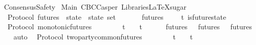 %
\begin{isabellebody}%
%
%
\isadelimdocument
%
\endisadelimdocument
%
\isatagdocument
%
\isamarkuptrue%
%
\endisatagdocument
{\isafolddocument}%
%
\isadelimdocument
%
\endisadelimdocument
%
\isadelimtheory
%
\endisadelimtheory
%
\isatagtheory
{}\isamarkupfalse%
\ ConsensusSafety\isanewline
\isanewline
{}\ Main\ CBCCasper\ {\isachardoublequoteopen}Libraries{\isacharslash}LaTeXsugar{\isachardoublequoteclose}\isanewline
\isanewline
{}%
\endisatagtheory
{\isafoldtheory}%
%
\isadelimtheory
\isanewline
%
\endisadelimtheory
\isanewline
\isanewline
\isanewline
\isanewline
\isanewline
{}\isamarkupfalse%
\ {\isacharparenleft}\ Protocol{\isacharparenright}\ futures\ {\isacharcolon}{\isacharcolon}\ {\isachardoublequoteopen}state\ {\isasymRightarrow}\ state\ set{\isachardoublequoteclose}\isanewline
\ \ \isanewline
\ \ \ \ {\isachardoublequoteopen}futures\ {\isasymsigma}\ {\isacharequal}\ {\isacharbraceleft}{\isasymsigma}{\isacharprime}\ {\isasymin}\ {\isasymSigma}t{\isachardot}\ is{\isacharunderscore}future{\isacharunderscore}state\ {\isacharparenleft}{\isasymsigma}{\isacharcomma}\ {\isasymsigma}{\isacharprime}{\isacharparenright}{\isacharbraceright}{\isachardoublequoteclose}\isanewline
\isanewline
\isanewline
{}\isamarkupfalse%
\ {\isacharparenleft}\ Protocol{\isacharparenright}\ monotonic{\isacharunderscore}futures\ {\isacharcolon}\isanewline
\ \ {\isachardoublequoteopen}{\isasymforall}\ {\isasymsigma}{\isacharprime}\ {\isasymsigma}{\isachardot}\ {\isasymsigma}{\isacharprime}\ {\isasymin}\ {\isasymSigma}t\ {\isasymand}\ {\isasymsigma}\ {\isasymin}\ {\isasymSigma}t\isanewline
\ \ \ {\isasymlongrightarrow}\ {\isasymsigma}{\isacharprime}\ {\isasymin}\ futures\ {\isasymsigma}\ {\isasymlongleftrightarrow}\ futures\ {\isasymsigma}{\isacharprime}\ {\isasymsubseteq}\ futures\ {\isasymsigma}{\isachardoublequoteclose}\isanewline
%
\isadelimproof
\ \ %
\endisadelimproof
%
\isatagproof
{}\isamarkupfalse%
\ auto%
\endisatagproof
{\isafoldproof}%
%
\isadelimproof
\isanewline
%
\endisadelimproof
\isanewline
\isanewline
{}\isamarkupfalse%
\ {\isacharparenleft}\ Protocol{\isacharparenright}\ two{\isacharunderscore}party{\isacharunderscore}common{\isacharunderscore}futures\ {\isacharcolon}\isanewline
\ \ {\isachardoublequoteopen}{\isasymforall}\ {\isasymsigma}{}\ {\isasymsigma}{}{\isachardot}\ {\isasymsigma}{}\ {\isasymin}\ {\isasymSigma}t\ {\isasymand}\ {\isasymsigma}{}\ {\isasymin}\ {\isasymSigma}t\isanewline

\end{isabellebody}
